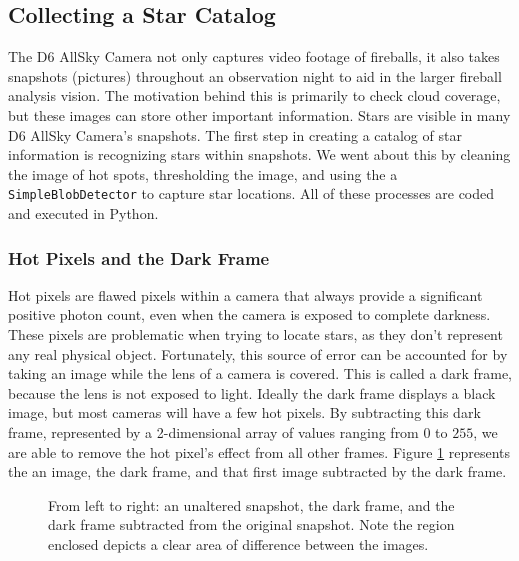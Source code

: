 \subsection{Collecting a Star Catalog}

The D6 AllSky Camera not only captures video footage of fireballs, it also takes snapshots (pictures) throughout an observation night to aid in the larger fireball analysis vision.
The motivation behind this is primarily to check cloud coverage, but these images can store other important information.
Stars are visible in many D6 AllSky Camera's snapshots.  
The first step in creating a catalog of star information is recognizing stars within snapshots.  
We went about this by cleaning the image of hot spots, thresholding the image, and using the a \texttt{SimpleBlobDetector} to capture star locations.
All of these processes are coded and executed in Python.

\subsubsection{Hot Pixels and the Dark Frame}

Hot pixels are flawed pixels within a camera that always provide a significant positive photon count, even when the camera is exposed to complete darkness.
These pixels are problematic when trying to locate stars, as they don't represent any real physical object.
Fortunately, this source of error can be accounted for by taking an image while the lens of a camera is covered.  
This is called a dark frame, because the lens is not exposed to light.
Ideally the dark frame displays a black image, but most cameras will have a few hot pixels.
By subtracting this dark frame, represented by a 2-dimensional array of values ranging from $0$ to $255$, we are able to remove the hot pixel's effect from all other frames.
Figure \ref{hotpix} represents the an image, the dark frame, and that first image subtracted by the dark frame.



\begin{figure}[ht!]
  \caption{From left to right: an unaltered snapshot, the dark frame, and the dark frame subtracted from the original snapshot.  Note the region enclosed depicts a clear area of difference between the images.}
  \label{hotpix}
\end{figure}



